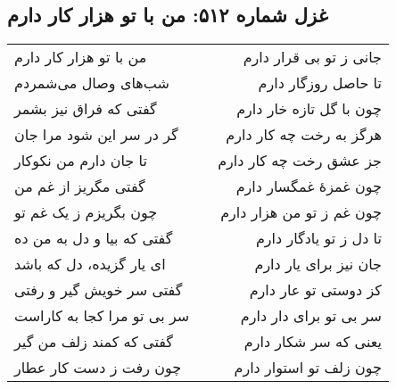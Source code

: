 \begin{center}
\section*{غزل شماره ۵۱۲: من با تو هزار کار دارم}
\label{sec:512}
\begin{longtable}{l p{0.5cm} r}
من با تو هزار کار دارم
&&
جانی ز تو بی قرار دارم
\\
شب‌های وصال می‌شمردم
&&
تا حاصل روزگار دارم
\\
گفتی که فراق نیز بشمر
&&
چون با گل تازه خار دارم
\\
گر در سر این شود مرا جان
&&
هرگز به رخت چه کار دارم
\\
تا جان دارم من نکوکار
&&
جز عشق رخت چه کار دارم
\\
گفتی مگریز از غم من
&&
چون غمزهٔ غمگسار دارم
\\
چون بگریزم ز یک غم تو
&&
چون غم ز تو من هزار دارم
\\
گفتی که بیا و دل به من ده
&&
تا دل ز تو یادگار دارم
\\
ای یار گزیده، دل که باشد
&&
جان نیز برای یار دارم
\\
گفتی سر خویش گیر و رفتی
&&
کز دوستی تو عار دارم
\\
سر بی تو مرا کجا به کاراست
&&
سر بی تو برای دار دارم
\\
گفتی که کمند زلف من گیر
&&
یعنی که سر شکار دارم
\\
چون رفت ز دست کار عطار
&&
چون زلف تو استوار دارم
\\
\end{longtable}
\end{center}

